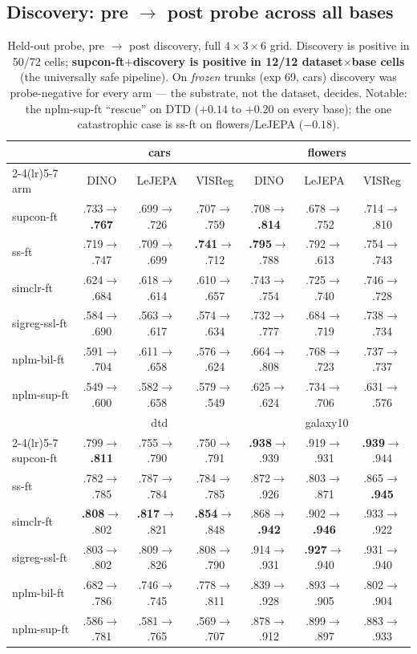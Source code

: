 \documentclass[11pt]{article}
\newcommand{\best}[1]{\textbf{#1}}
\begin{document}
\subsection{Discovery: pre $\to$ post probe across all bases}

\begin{table}[h]\centering\footnotesize
\setlength{\tabcolsep}{3.5pt}
\begin{tabular}{l ccc ccc}
\toprule
& \multicolumn{3}{c}{cars} & \multicolumn{3}{c}{flowers} \\
\cmidrule(lr){2-4}\cmidrule(lr){5-7}
arm & DINO & LeJEPA & VISReg & DINO & LeJEPA & VISReg \\
\midrule
supcon-ft & .733$\to$\best{.767} & .699$\to$.726 & .707$\to$.759 & .708$\to$\best{.814} & .678$\to$.752 & .714$\to$.810 \\
ss-ft & .719$\to$.747 & .709$\to$.699 & \best{.741}$\to$.712 & \best{.795}$\to$.788 & .792$\to$.613 & .754$\to$.743 \\
simclr-ft & .624$\to$.684 & .618$\to$.614 & .610$\to$.657 & .743$\to$.754 & .725$\to$.740 & .746$\to$.728 \\
sigreg-ssl-ft & .584$\to$.690 & .563$\to$.617 & .574$\to$.634 & .732$\to$.777 & .684$\to$.719 & .738$\to$.734 \\
nplm-bil-ft & .591$\to$.704 & .611$\to$.658 & .576$\to$.624 & .664$\to$.808 & .768$\to$.723 & .737$\to$.737 \\
nplm-sup-ft & .549$\to$.600 & .582$\to$.658 & .579$\to$.549 & .625$\to$.624 & .734$\to$.706 & .631$\to$.576 \\
\midrule
& \multicolumn{3}{c}{dtd} & \multicolumn{3}{c}{galaxy10} \\
\cmidrule(lr){2-4}\cmidrule(lr){5-7}
supcon-ft & .799$\to$\best{.811} & .755$\to$.790 & .750$\to$.791 & \best{.938}$\to$.939 & .919$\to$.931 & \best{.939}$\to$.944 \\
ss-ft & .782$\to$.785 & .787$\to$.784 & .784$\to$.785 & .872$\to$.926 & .803$\to$.871 & .865$\to$\best{.945} \\
simclr-ft & \best{.808}$\to$.802 & \best{.817}$\to$.821 & \best{.854}$\to$.848 & .868$\to$\best{.942} & .902$\to$\best{.946} & .933$\to$.922 \\
sigreg-ssl-ft & .803$\to$.802 & .809$\to$.826 & .808$\to$.790 & .914$\to$.931 & \best{.927}$\to$.940 & .931$\to$.940 \\
nplm-bil-ft & .682$\to$.786 & .746$\to$.745 & .778$\to$.811 & .839$\to$.928 & .893$\to$.905 & .802$\to$.904 \\
nplm-sup-ft & .586$\to$.781 & .581$\to$.765 & .569$\to$.707 & .878$\to$.912 & .899$\to$.897 & .883$\to$.933 \\
\bottomrule
\end{tabular}
\caption{Held-out probe, pre $\to$ post discovery, full
$4\times3\times6$ grid.  Discovery is positive in 50/72 cells;
\textbf{supcon-ft$+$discovery is positive in 12/12 dataset$\times$base
cells} (the universally safe pipeline).  On \emph{frozen} trunks (exp
69, cars) discovery was probe-negative for every arm --- the substrate,
not the dataset, decides.  Notable: the nplm-sup-ft ``rescue'' on DTD
($+0.14$ to $+0.20$ on every base); the one catastrophic case is ss-ft
on flowers/LeJEPA ($-0.18$).}
\end{table}
\end{document}
